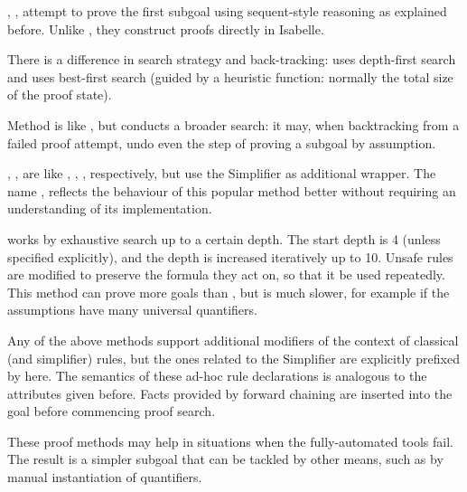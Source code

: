 \begin{isabellebody}
\begin{isamarkuptext}
\begin{description}
  \item \hyperlink{method.fast}{\mbox{}}, \hyperlink{method.best}{\mbox{}}, \hyperlink{method.slow}{\mbox{}} attempt to
  prove the first subgoal using sequent-style reasoning as explained
  before.  Unlike \hyperlink{method.blast}{\mbox{}}, they construct proofs directly in
  Isabelle.

  There is a difference in search strategy and back-tracking: \hyperlink{method.fast}{\mbox{}} uses depth-first search and \hyperlink{method.best}{\mbox{}} uses best-first
  search (guided by a heuristic function: normally the total size of
  the proof state).

  Method \hyperlink{method.slow}{\mbox{}} is like \hyperlink{method.fast}{\mbox{}}, but conducts a broader
  search: it may, when backtracking from a failed proof attempt, undo
  even the step of proving a subgoal by assumption.

  \item \hyperlink{method.fastforce}{\mbox{}}, \hyperlink{method.slowsimp}{\mbox{}}, \hyperlink{method.bestsimp}{\mbox{}}
  are like \hyperlink{method.fast}{\mbox{}}, \hyperlink{method.slow}{\mbox{}}, \hyperlink{method.best}{\mbox{}},
  respectively, but use the Simplifier as additional wrapper. The name
  \hyperlink{method.fastforce}{\mbox{}}, reflects the behaviour of this popular method
  better without requiring an understanding of its implementation.

  \item \hyperlink{method.deepen}{\mbox{}} works by exhaustive search up to a certain
  depth.  The start depth is 4 (unless specified explicitly), and the
  depth is increased iteratively up to 10.  Unsafe rules are modified
  to preserve the formula they act on, so that it be used repeatedly.
  This method can prove more goals than \hyperlink{method.fast}{\mbox{}}, but is much
  slower, for example if the assumptions have many universal
  quantifiers.

  \end{description}

  Any of the above methods support additional modifiers of the context
  of classical (and simplifier) rules, but the ones related to the
  Simplifier are explicitly prefixed by  here.  The
  semantics of these ad-hoc rule declarations is analogous to the
  attributes given before.  Facts provided by forward chaining are
  inserted into the goal before commencing proof search.%
\end{isamarkuptext}%
\isamarkuptrue%
%
\isamarkuptrue%
%
\begin{isamarkuptext}%
These proof methods may help in situations when the
  fully-automated tools fail.  The result is a simpler subgoal that
  can be tackled by other means, such as by manual instantiation of
  quantifiers.


\end{isamarkuptext}
\end{isabellebody}
